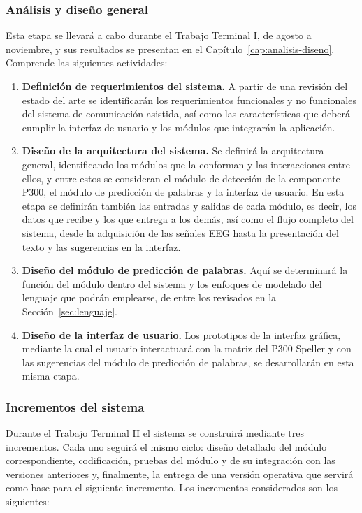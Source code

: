 \subsubsection{Análisis y diseño general}

Esta etapa se llevará a cabo durante el Trabajo Terminal I, de agosto a noviembre, y sus resultados
se presentan en el Capítulo~\ref{cap:analisis-diseno}. Comprende las siguientes actividades:

\begin{enumerate}
  \item \textbf{Definición de requerimientos del sistema.} A partir de una revisión del estado del
  arte se identificarán los requerimientos funcionales y no funcionales del sistema de
  comunicación asistida, así como las características que deberá cumplir la interfaz de usuario y
  los módulos que integrarán la aplicación.
  \item \textbf{Diseño de la arquitectura del sistema.} Se definirá la arquitectura general,
  identificando los módulos que la conforman y las interacciones entre ellos, y entre estos se
  consideran el módulo de detección de la componente P300, el módulo de predicción de palabras y
  la interfaz de usuario. En esta etapa se definirán también las entradas y salidas de cada módulo,
  es decir, los datos que recibe y los que entrega a los demás, así como el flujo completo del
  sistema, desde la adquisición de las señales EEG hasta la presentación del texto y las sugerencias en
  la interfaz.
  \item \textbf{Diseño del módulo de predicción de palabras.} Aquí se determinará la función del
  módulo dentro del sistema y los enfoques de modelado del lenguaje que podrán emplearse, de entre
  los revisados en la Sección~\ref{sec:lenguaje}.
  \item \textbf{Diseño de la interfaz de usuario.} Los prototipos de la interfaz gráfica, mediante
  la cual el usuario interactuará con la matriz del P300 Speller y con las sugerencias del módulo
  de predicción de palabras, se desarrollarán en esta misma etapa.
\end{enumerate}

\subsubsection{Incrementos del sistema}

Durante el Trabajo Terminal II el sistema se construirá mediante tres incrementos. Cada uno seguirá
el mismo ciclo: diseño detallado del módulo correspondiente, codificación, pruebas del módulo y de
su integración con las versiones anteriores y, finalmente, la entrega de una versión operativa que
servirá como base para el siguiente incremento. Los incrementos considerados son los siguientes:

